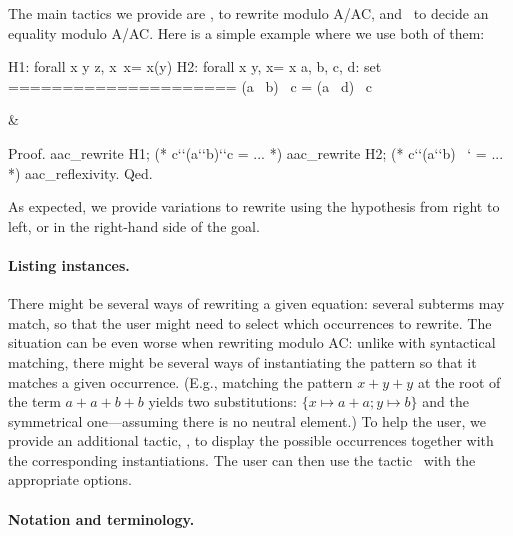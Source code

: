 \documentclass{llncs}
\begin{document}
The main tactics we provide are \aacrewrite, to rewrite modulo
A/AC, and \aacreflexivity\, to decide an equality modulo A/AC.
Here is a simple example where we use both of them:
\begin{twolistings}
\begin{coq}
H1: forall x y z, x\capy \cup~x\capz = x\cap(y\cupz)
H2: forall x y, x\capx = x
a, b, c, d: set
=====================
(a\capc \cup~ b\capc\capd) \cap~c = (a \cup~d\capb) \cap~c
\end{coq}&
\begin{coq}
Proof.
 aac_rewrite H1; (* c`\cap`(a`\cup`b\capd)`\cap`c = ... *)
 aac_rewrite H2; (* c`\cap`(a`\cup`b\capd) \tab~`  = ... *)
 aac_reflexivity.
Qed.
\end{coq}
\end{twolistings}
\noindent
As expected, we provide variations to rewrite using the hypothesis
from right to left, or in the right-hand side of the goal.

\paragraph{Listing instances.} 

There might be several ways of rewriting a given equation: several
subterms may match, so that the user might need to select which
occurrences to rewrite. The situation can be even worse when rewriting
modulo AC: unlike with syntactical matching, there might be several
ways of instantiating the pattern so that it matches a given
occurrence. (E.g., matching the pattern $x+y+y$ at the root of the
term $a+a+b+b$ yields two substitutions: $\{x\mapsto a+a;y\mapsto b\}$
and the symmetrical one---assuming there is no neutral element.)  To
help the user, we provide an additional tactic, \aacinstances, to
display the possible occurrences together with the corresponding
instantiations. The user can then use the tactic \aacrewrite\ with the
appropriate options.

\paragraph{Notation and terminology.} 
\end{document}
